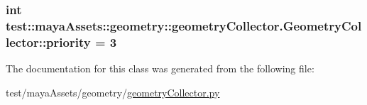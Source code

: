 \hypertarget{classtest_1_1mayaAssets_1_1geometry_1_1geometryCollector_1_1GeometryCollector_adaf88ad642cbfe389a9bf6202871daae}{
\subsubsection[{priority}]{\setlength{\rightskip}{0pt plus 5cm}int {\bf test\-::maya\-Assets\-::geometry\-::geometry\-Collector.\-Geometry\-Collector\-::priority} = 3}}\label{d8/dc5/classtest_1_1mayaAssets_1_1geometry_1_1geometryCollector_1_1GeometryCollector_adaf88ad642cbfe389a9bf6202871daae}


\-The documentation for this class was generated from the following file\-:\begin{DoxyCompactItemize}
\item 
test/maya\-Assets/geometry/\hyperlink{geometryCollector_8py}{geometry\-Collector.\-py}\end{DoxyCompactItemize}
